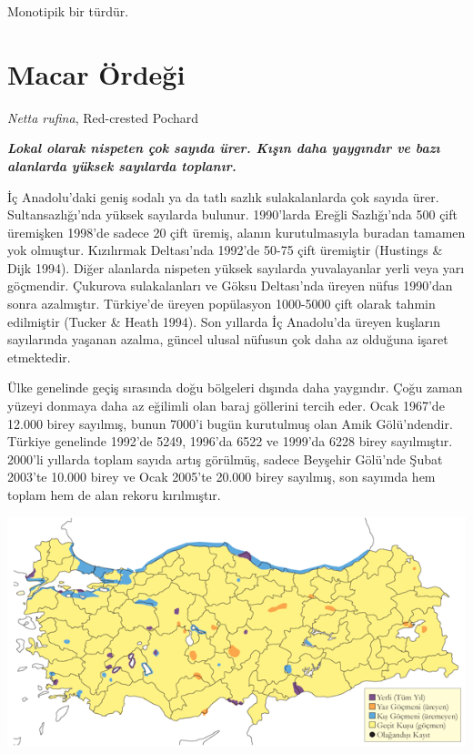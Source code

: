 \documentclass[
  letterpaper,
  DIV=11,
  numbers=noendperiod]{scrreprt}
\begin{document}
Monotipik bir türdür.

\section{Macar Ördeği}\label{macar-uxf6rdeux11fi}

\emph{Netta rufina}, Red-crested Pochard

\textbf{\emph{Lokal olarak nispeten çok sayıda ürer. Kışın daha
yaygındır ve bazı alanlarda yüksek sayılarda toplanır.}}

İç Anadolu'daki geniş sodalı ya da tatlı sazlık sulakalanlarda çok
sayıda ürer. Sultansazlığı'nda yüksek sayılarda bulunur. 1990'larda
Ereğli Sazlığı'nda 500 çift üremişken 1998'de sadece 20 çift üremiş,
alanın kurutulmasıyla buradan tamamen yok olmuştur. Kızılırmak
Deltası'nda 1992'de 50-75 çift üremiştir (Hustings \& Dijk 1994). Diğer
alanlarda nispeten yüksek sayılarda yuvalayanlar yerli veya yarı
göçmendir. Çukurova sulakalanları ve Göksu Deltası'nda üreyen nüfus
1990'dan sonra azalmıştır. Türkiye'de üreyen popülasyon 1000-5000 çift
olarak tahmin edilmiştir (Tucker \& Heath 1994). Son yıllarda İç
Anadolu'da üreyen kuşların sayılarında yaşanan azalma, güncel ulusal
nüfusun çok daha az olduğuna işaret etmektedir.

Ülke genelinde geçiş sırasında doğu bölgeleri dışında daha yaygındır.
Çoğu zaman yüzeyi donmaya daha az eğilimli olan baraj göllerini tercih
eder. Ocak 1967'de 12.000 birey sayılmış, bunun 7000'i bugün kurutulmuş
olan Amik Gölü'ndendir. Türkiye genelinde 1992'de 5249, 1996'da 6522 ve
1999'da 6228 birey sayılmıştır. 2000'li yıllarda toplam sayıda artış
görülmüş, sadece Beyşehir Gölü'nde Şubat 2003'te 10.000 birey ve Ocak
2005'te 20.000 birey sayılmış, son sayımda hem toplam hem de alan rekoru
kırılmıştır.

\includegraphics{images/harita_Page_022.png}
\end{document}
